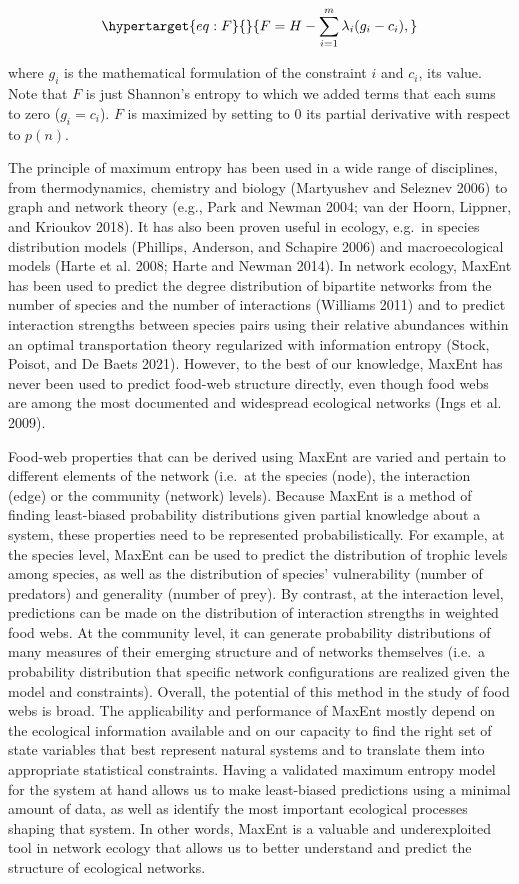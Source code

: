 \documentclass[11pt]{article}
\begin{document}
\begin{equation}\protect\hypertarget{eq:F}{}{F = H - \sum_{i=1}^m \lambda_i (g_i-c_i),}\label{eq:F}\end{equation}

where \(g_i\) is the mathematical formulation of the constraint \(i\)
and \(c_i\), its value. Note that \(F\) is just Shannon's entropy to
which we added terms that each sums to zero (\(g_i = c_i\)). \(F\) is
maximized by setting to \(0\) its partial derivative with respect to
\(p(n)\).

The principle of maximum entropy has been used in a wide range of
disciplines, from thermodynamics, chemistry and biology (Martyushev and
Seleznev 2006) to graph and network theory (e.g., Park and Newman 2004;
van der Hoorn, Lippner, and Krioukov 2018). It has also been proven
useful in ecology, e.g.~in species distribution models (Phillips,
Anderson, and Schapire 2006) and macroecological models (Harte et al.
2008; Harte and Newman 2014). In network ecology, MaxEnt has been used
to predict the degree distribution of bipartite networks from the number
of species and the number of interactions (Williams 2011) and to predict
interaction strengths between species pairs using their relative
abundances within an optimal transportation theory regularized with
information entropy (Stock, Poisot, and De Baets 2021). However, to the
best of our knowledge, MaxEnt has never been used to predict food-web
structure directly, even though food webs are among the most documented
and widespread ecological networks (Ings et al. 2009).

Food-web properties that can be derived using MaxEnt are varied and
pertain to different elements of the network (i.e.~at the species
(node), the interaction (edge) or the community (network) levels).
Because MaxEnt is a method of finding least-biased probability
distributions given partial knowledge about a system, these properties
need to be represented probabilistically. For example, at the species
level, MaxEnt can be used to predict the distribution of trophic levels
among species, as well as the distribution of species' vulnerability
(number of predators) and generality (number of prey). By contrast, at
the interaction level, predictions can be made on the distribution of
interaction strengths in weighted food webs. At the community level, it
can generate probability distributions of many measures of their
emerging structure and of networks themselves (i.e.~a probability
distribution that specific network configurations are realized given the
model and constraints). Overall, the potential of this method in the
study of food webs is broad. The applicability and performance of MaxEnt
mostly depend on the ecological information available and on our
capacity to find the right set of state variables that best represent
natural systems and to translate them into appropriate statistical
constraints. Having a validated maximum entropy model for the system at
hand allows us to make least-biased predictions using a minimal amount
of data, as well as identify the most important ecological processes
shaping that system. In other words, MaxEnt is a valuable and
underexploited tool in network ecology that allows us to better
understand and predict the structure of ecological networks.
\end{document}

